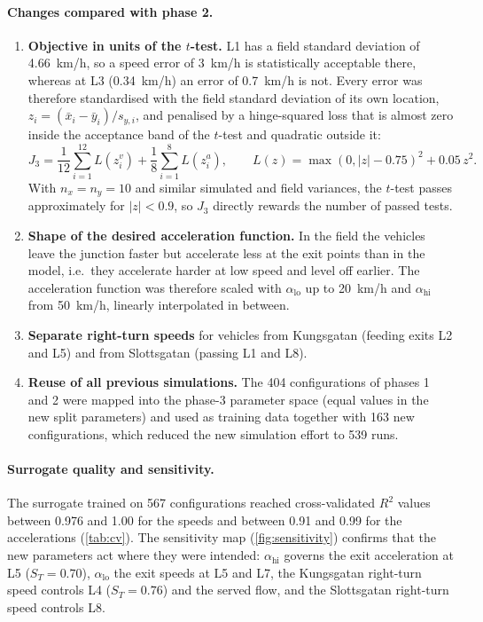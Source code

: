 \documentclass[11pt,a4paper]{article}
\newcommand{\kmh}{~km/h}
\begin{document}
\paragraph{Changes compared with phase 2.}
\begin{enumerate}
  \item \textbf{Objective in units of the $t$-test.} L1 has a field standard deviation of
        4.66\kmh, so a speed error of 3\kmh{} is statistically acceptable there, whereas at L3
        (0.34\kmh) an error of 0.7\kmh{} is not. Every error was therefore standardised with the
        field standard deviation of its own location, $z_i = (\bar x_i - \bar y_i)/s_{y,i}$, and
        penalised by a hinge-squared loss that is almost zero inside the acceptance band of the
        $t$-test and quadratic outside it:
        \begin{equation}
        J_3 = \frac{1}{12}\sum_{i=1}^{12} L(z_i^{v}) + \frac{1}{8}\sum_{i=1}^{8} L(z_i^{a}),\qquad
        L(z) = \max(0,|z|-0.75)^2 + 0.05\,z^2 .
        \end{equation}
        With $n_x = n_y = 10$ and similar simulated and field variances, the $t$-test passes
        approximately for $|z| < 0.9$, so $J_3$ directly rewards the number of passed tests.
  \item \textbf{Shape of the desired acceleration function.} In the field the vehicles leave the
        junction faster but accelerate less at the exit points than in the model, i.e.\ they
        accelerate harder at low speed and level off earlier. The acceleration function was
        therefore scaled with $\alpha_{\mathrm{lo}}$ up to 20\kmh{} and $\alpha_{\mathrm{hi}}$ from
        50\kmh, linearly interpolated in between.
  \item \textbf{Separate right-turn speeds} for vehicles from Kungsgatan (feeding exits L2 and L5)
        and from Slottsgatan (passing L1 and L8).
  \item \textbf{Reuse of all previous simulations.} The 404 configurations of phases 1 and 2 were
        mapped into the phase-3 parameter space (equal values in the new split parameters) and used
        as training data together with 163 new configurations, which reduced the new simulation
        effort to 539 runs.
\end{enumerate}

\paragraph{Surrogate quality and sensitivity.} The surrogate trained on 567 configurations reached
cross-validated $R^2$ values between 0.976 and 1.00 for the speeds and between 0.91 and 0.99 for
the accelerations (\cref{tab:cv}). The sensitivity map (\cref{fig:sensitivity}) confirms that the
new parameters act where they were intended: $\alpha_{\mathrm{hi}}$ governs the exit acceleration at
L5 ($S_T = 0.70$), $\alpha_{\mathrm{lo}}$ the exit speeds at L5 and L7, the Kungsgatan right-turn
speed controls L4 ($S_T = 0.76$) and the served flow, and the Slottsgatan right-turn speed controls
L8.
\end{document}
